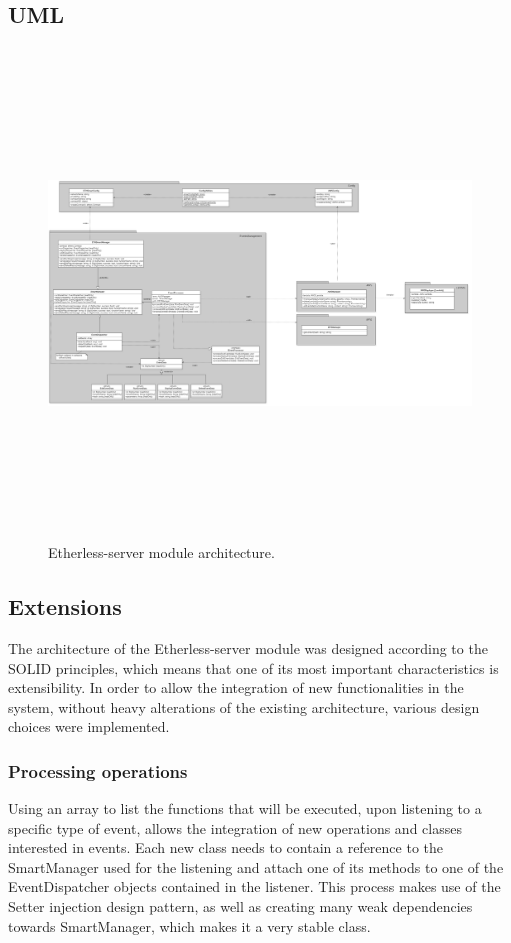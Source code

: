 	\begin{landscape}
	\subsection{UML}
		\begin{figure}[H]
			\includegraphics[width=24cm, height=13cm]{././diagrammi/etherless-server/Etherless-server-package-class.png}
			\caption{Etherless-server module architecture.}
		\end{figure}
	\end{landscape}
	\restoregeometry

	\subsection{Extensions}  %
	The architecture of the Etherless-server module was designed according to the SOLID principles, which means that one of its most important characteristics is extensibility. In order to allow the integration of new functionalities in the system, without heavy alterations of the existing architecture, various design choices were implemented.
		\subsubsection{Processing operations}
		Using an array to list the functions that will be executed, upon listening to a specific type of event, allows the integration of new operations and classes interested in events. Each new class needs to contain a reference to the SmartManager used for the listening and attach one of its methods to one of the EventDispatcher objects contained in the listener. This process makes use of the Setter injection design pattern, as well as creating many weak dependencies towards SmartManager, which makes it a very stable class.
